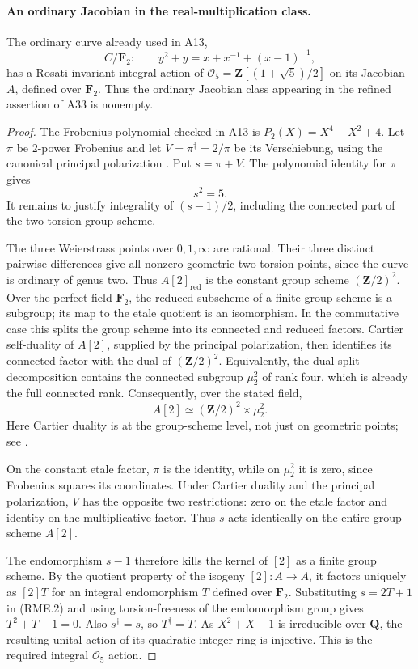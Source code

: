 \paragraph{An ordinary Jacobian in the real-multiplication class.}
The ordinary curve already used in A13,
\[
 C/\mathbf F_2:\qquad y^2+y=x+x^{-1}+(x-1)^{-1},
 \tag{RME.1}
\]
has a Rosati-invariant integral action of
$\mathcal O_5=\mathbf Z[(1+\sqrt5)/2]$ on its Jacobian $A$,
defined over $\mathbf F_2$. Thus the ordinary Jacobian class
appearing in the refined assertion of A33 is nonempty.

\begin{proof}
The Frobenius polynomial checked in A13 is
$P_2(X)=X^4-X^2+4$. Let $\pi$ be $2$-power Frobenius and
let $V=\pi^\dagger=2/\pi$ be its Verschiebung, using the
canonical principal polarization
\cite[Lemma~19.2]{MilneAV}. Put $s=\pi+V$. The polynomial
identity for $\pi$ gives
\[
                              s^2=5.
 \tag{RME.2}
\]
It remains to justify integrality of $(s-1)/2$, including the
connected part of the two-torsion group scheme.

The three Weierstrass points over $0,1,\infty$ are rational.
Their three distinct pairwise differences give all nonzero
geometric two-torsion points, since the curve is ordinary of
genus two. Thus $A[2]_{\mathrm{red}}$ is the constant group
scheme $(\mathbf Z/2)^2$. Over the perfect field $\mathbf F_2$,
the reduced subscheme of a finite group scheme is a subgroup;
its map to the etale quotient is an isomorphism. In the
commutative case this splits the group scheme into its connected
and reduced factors. Cartier self-duality of $A[2]$, supplied
by the principal polarization, then identifies its connected
factor with the dual of $(\mathbf Z/2)^2$. Equivalently, the
dual split decomposition contains the connected subgroup
$\mu_2^2$ of rank four, which is already the full connected
rank. Consequently, over the stated field,
\[
                       A[2]\simeq(\mathbf Z/2)^2\times\mu_2^2.
 \tag{RME.3}
\]
Here Cartier duality is at the group-scheme level, not just on
geometric points; see \cite[Theorem~11.1 and the opening of
Section~16, pp.~18 and~29]{MilneAV}.

On the constant etale factor, $\pi$ is the identity, while on
$\mu_2^2$ it is zero, since Frobenius squares its coordinates.
Under Cartier duality and the principal polarization, $V$ has
the opposite two restrictions: zero on the etale factor and
identity on the multiplicative factor. Thus $s$ acts identically
on the entire group scheme $A[2]$.

The endomorphism $s-1$ therefore kills the kernel of $[2]$ as
a finite group scheme. By the quotient property of the isogeny
$[2]:A\to A$, it factors uniquely as $[2]T$ for an integral
endomorphism $T$ defined over $\mathbf F_2$. Substituting
$s=2T+1$ in (RME.2) and using torsion-freeness of the
endomorphism group gives $T^2+T-1=0$. Also $s^\dagger=s$, so
$T^\dagger=T$. As $X^2+X-1$ is irreducible over $\mathbf Q$,
the resulting unital action of its quadratic integer ring is
injective. This is the required integral $\mathcal O_5$ action.
\end{proof}

